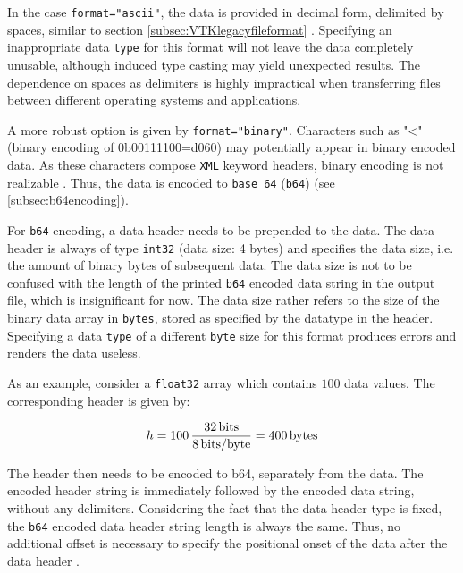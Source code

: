 \bigbreak
In the case \lstinline{format="ascii"}, the data is provided in decimal form, delimited by spaces, similar to section \ref{subsec:VTKlegacyfileformat} \cite{Bun09}. Specifying an inappropriate data \lstinline[language=XML]{type} for this format will not leave the data completely unusable, although induced type casting may yield unexpected results. The dependence on spaces as delimiters is highly impractical when transferring files between different operating systems and applications. 

\bigbreak
A more robust option is given by \lstinline{format="binary"}. Characters such as "<" (binary encoding of 0b00111100=d060) may potentially appear in binary encoded data. As these characters compose \texttt{XML} keyword headers, binary encoding is not realizable \cite{Bun09}. Thus, the data is encoded to \texttt{base 64} (\texttt{b64}) (see \ref{subsec:b64encoding}). 

\bigbreak
For \texttt{b64} encoding, a data header needs to be prepended to the data. The data header is always of type \lstinline[language=C]{int32} (data size: 4 bytes) and specifies the data size, i.e. the amount of binary bytes of subsequent data. The data size is not to be confused with the length of the printed \texttt{b64} encoded data string in the output file, which is insignificant for now. The data size rather refers to the size of the binary data array in \lstinline[language=C]{bytes}, stored as specified by the datatype in the header. Specifying a data \lstinline[language=XML]{type} of a different \texttt{byte} size for this format produces errors and renders the data useless.

\bigbreak
As an example, consider a \lstinline[language=C]{float32} array which contains $100$ data values. The corresponding header is given by:

\begin{equation}
\label{eq:b64inlineex}
    h=100\,\frac{32\,{\rm bits}}{8\,{\rm bits}/{\rm byte}}=400\,{\rm bytes}
\end{equation}

\bigbreak
The header then needs to be encoded to b64, separately from the data. The encoded header string is immediately followed by the encoded data string, without any delimiters. Considering the fact that the data header type is fixed, the \texttt{b64} encoded data header string length is always the same. Thus, no additional offset is necessary to specify the positional onset of the data after the data header \cite{Bun09}.

